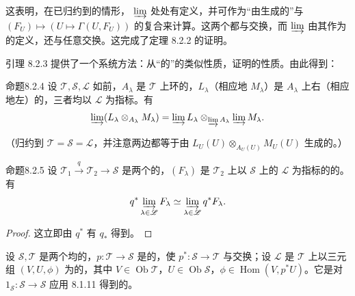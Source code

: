 这表明，在已归约到的情形， $\varinjlim$ 处处有定义，并可作为“由生成的”与 $(F_U)\mapsto(U\mapsto\Gamma(U,F_U))$ 的复合来计算。这两个都与交换，而 $\varinjlim$ 由其作为的定义，还与任意交换。这完成了定理 8.2.2 的证明。

引理 8.2.3 提供了一个系统方法：从“的”的类似性质，证明的性质。由此得到：
\begin{SGAresult}{命题}{8.2.4}
设 $\mathscr T,\mathscr S,\mathscr L$ 如前，$A_\lambda$ 是 $\mathscr T$ 上环的，$L_\lambda$（相应地 $M_\lambda$）是 $A_\lambda$ 上右（相应地左）的，三者均以 $\mathscr L$ 为指标。有
\[\varinjlim(L_\lambda\otimes_{A_\lambda}M_\lambda)=\varinjlim L_\lambda\otimes_{\varinjlim A_\lambda}\varinjlim M_\lambda.\]
\end{SGAresult}
（归约到 $\mathscr T=\mathscr S=\mathscr L$，并注意两边都等于由 $L_U(U)\otimes_{A_U(U)}M_U(U)$ 生成的。）
\begin{SGAresult}{命题}{8.2.5}
设 $\mathscr T_1\xrightarrow{q}\mathscr T_2\to\mathscr S$ 是两个的，$(F_\lambda)$ 是 $\mathscr T_2$ 上以 $\mathscr S$ 上的 $\mathscr L$ 为指标的的。有
\[q^*\varinjlim_{\lambda\in\mathscr L}F_\lambda\simeq\varinjlim_{\lambda\in\mathscr L}q^*F_\lambda.\]
\end{SGAresult}
\begin{proof}这立即由 $q^*$ 有 $q_*$ 得到。\end{proof}
设 $\mathscr S,\mathscr T$ 是两个均的，$p:\mathscr T\to\mathscr S$ 是的，使 $p^*:\mathscr S\to\mathscr T$ 与交换；设 $\mathscr L$ 是 $\mathscr T$ 上以三元组 $(V,U,\phi)$ 为的，其中 $V\in\operatorname{Ob}\mathscr T$，$U\in\operatorname{Ob}\mathscr S$，$\phi\in\operatorname{Hom}(V,p^*U)$。它是对 $1_{\mathscr S}:\mathscr S\to\mathscr S$ 应用 8.1.11 得到的。
